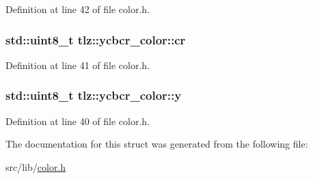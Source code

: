 Definition at line 42 of file color.\+h.

\subsubsection[{\texorpdfstring{cr}{cr}}]{\setlength{\rightskip}{0pt plus 5cm}std\+::uint8\+\_\+t tlz\+::ycbcr\+\_\+color\+::cr}\hypertarget{structtlz_1_1ycbcr__color_afa551c8ab50c0f44d39eb215603f1960}{}\label{structtlz_1_1ycbcr__color_afa551c8ab50c0f44d39eb215603f1960}


Definition at line 41 of file color.\+h.

\subsubsection[{\texorpdfstring{y}{y}}]{\setlength{\rightskip}{0pt plus 5cm}std\+::uint8\+\_\+t tlz\+::ycbcr\+\_\+color\+::y}\hypertarget{structtlz_1_1ycbcr__color_affd190ed3ca65a9e75080a22b149a1d2}{}\label{structtlz_1_1ycbcr__color_affd190ed3ca65a9e75080a22b149a1d2}


Definition at line 40 of file color.\+h.



The documentation for this struct was generated from the following file\+:\begin{DoxyCompactItemize}
\item 
src/lib/\hyperlink{color_8h}{color.\+h}\end{DoxyCompactItemize}
